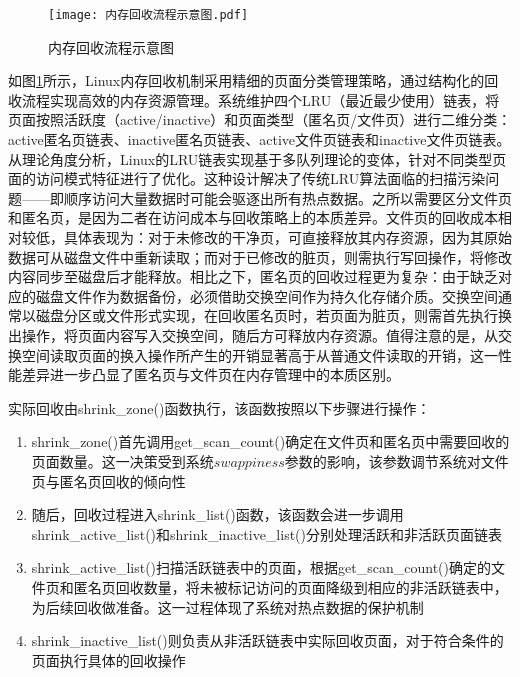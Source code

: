 \begin{figure}[htb]
    \centering
    \texttt{[image: 内存回收流程示意图.pdf]}
    \caption{内存回收流程示意图}
    \label{fig:memory_reclaim_mechanism}
\end{figure}

如图\ref{fig:memory_reclaim_mechanism}所示，Linux内存回收机制采用精细的页面分类管理策略，通过结构化的回收流程实现高效的内存资源管理。系统维护四个LRU（最近最少使用）链表，将页面按照活跃度（active/inactive）和页面类型（匿名页/文件页）进行二维分类：active匿名页链表、inactive匿名页链表、active文件页链表和inactive文件页链表。从理论角度分析，Linux的LRU链表实现基于多队列理论的变体，针对不同类型页面的访问模式特征进行了优化。这种设计解决了传统LRU算法面临的扫描污染问题——即顺序访问大量数据时可能会驱逐出所有热点数据。之所以需要区分文件页和匿名页，是因为二者在访问成本与回收策略上的本质差异。文件页的回收成本相对较低，具体表现为：对于未修改的干净页，可直接释放其内存资源，因为其原始数据可从磁盘文件中重新读取；而对于已修改的脏页，则需执行写回操作，将修改内容同步至磁盘后才能释放。相比之下，匿名页的回收过程更为复杂：由于缺乏对应的磁盘文件作为数据备份，必须借助交换空间作为持久化存储介质。交换空间通常以磁盘分区或文件形式实现，在回收匿名页时，若页面为脏页，则需首先执行换出操作，将页面内容写入交换空间，随后方可释放内存资源。值得注意的是，从交换空间读取页面的换入操作所产生的开销显著高于从普通文件读取的开销，这一性能差异进一步凸显了匿名页与文件页在内存管理中的本质区别。

实际回收由shrink\_zone()函数执行，该函数按照以下步骤进行操作：

\begin{enumerate}
    \item shrink\_zone()首先调用get\_scan\_count()确定在文件页和匿名页中需要回收的页面数量。这一决策受到系统\(swappiness\)参数的影响，该参数调节系统对文件页与匿名页回收的倾向性

    \item 随后，回收过程进入shrink\_list()函数，该函数会进一步调用shrink\_active\_list()和shrink\_inactive\_list()分别处理活跃和非活跃页面链表

    \item shrink\_active\_list()扫描活跃链表中的页面，根据get\_scan\_count()确定的文件页和匿名页回收数量，将未被标记访问的页面降级到相应的非活跃链表中，为后续回收做准备。这一过程体现了系统对热点数据的保护机制

    \item shrink\_inactive\_list()则负责从非活跃链表中实际回收页面，对于符合条件的页面执行具体的回收操作
\end{enumerate}

